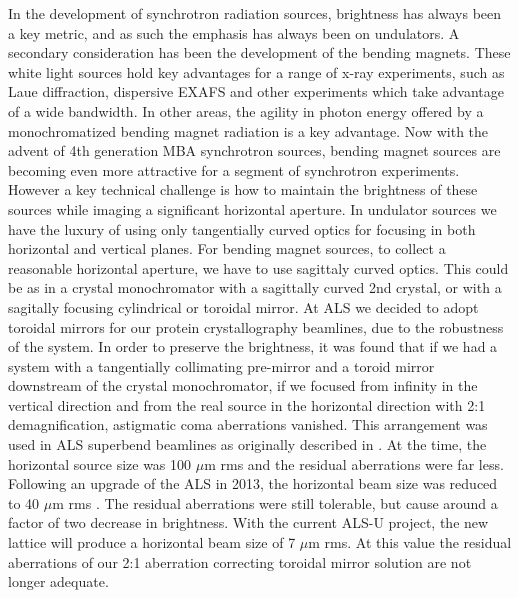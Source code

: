 \documentclass{iucr}              %
\begin{document}
In the development of synchrotron radiation sources, brightness has always been a key metric, and as such the emphasis has always been on undulators.  A secondary consideration has been the development of the bending magnets. These white light sources hold key advantages for a range of x-ray experiments, such as Laue diffraction, dispersive EXAFS and other experiments which take advantage of a wide bandwidth.  In other areas, the agility in photon energy offered by a monochromatized bending magnet radiation is a key advantage.  Now with the advent of 4th generation MBA synchrotron sources, bending magnet sources are becoming even more attractive for a segment of synchrotron experiments.  However a key technical challenge is how to maintain the brightness of these sources while imaging a significant horizontal aperture.  In undulator sources we have the luxury of using only tangentially curved optics for focusing in both horizontal and vertical planes.  For bending magnet sources, to collect a reasonable horizontal aperture, we have to use sagittaly curved optics.  This could be as in a crystal monochromator with a sagittally curved 2nd crystal, or with a sagitally focusing cylindrical or toroidal mirror.  At ALS we decided to adopt toroidal mirrors for our protein crystallography beamlines, due to the robustness of the system.  In order to preserve the brightness, it was found that if we had a system with a tangentially collimating pre-mirror and a toroid mirror downstream of the crystal monochromator, if we focused from infinity in the vertical direction and from the real source in the horizontal direction with 2:1 demagnification,  astigmatic coma aberrations vanished. This arrangement was used in ALS superbend beamlines as originally described in  \cite{MacDowell2004}.
At the time, the horizontal source size was 100 $\mu$m rms and the residual aberrations were far less.  Following an upgrade of the ALS in 2013, the horizontal beam size was reduced to 40 $\mu$m  rms \cite{Steier_2014}. The residual aberrations were still tolerable, but cause around a factor of two decrease in brightness.  With the current ALS-U project, the new lattice will produce a horizontal beam size of 7 $\mu$m rms.  At this value the residual aberrations of our 2:1 aberration correcting toroidal mirror solution are not longer adequate.
\end{document}
